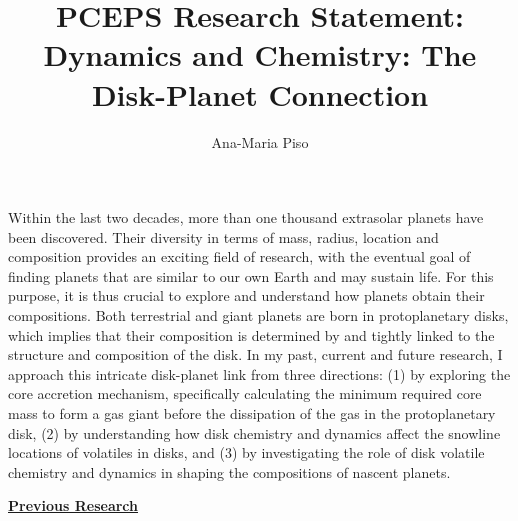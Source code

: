 \documentclass[12pt, letterpaper]{article}
\date{}
\title{\large PCEPS Research Statement: \\
Dynamics and Chemistry: The Disk-Planet Connection \vspace{-2.8ex}}
\author{\normalsize Ana-Maria Piso \vspace{-2.8ex}}
\begin{document}
\maketitle


\vspace{-1.5cm}

Within the last two decades, more than one thousand extrasolar planets have been discovered. Their diversity in terms of mass, radius, location and composition provides an exciting field of research, with the eventual goal of finding planets that are similar to our own Earth and may sustain life. For this purpose, it is thus crucial to explore and understand how planets obtain their compositions. Both terrestrial and giant planets are born in protoplanetary disks, which implies that their composition is determined by and tightly linked to the structure and composition of the disk. In my past, current and future research, I approach this intricate disk-planet link from three directions: (1) by exploring the core accretion mechanism, specifically calculating the minimum required core mass to form a gas giant before the dissipation of the gas in the protoplanetary disk, (2) by understanding how disk chemistry and dynamics affect the snowline locations of volatiles in disks, and (3) by investigating the role of disk volatile chemistry and dynamics in shaping the compositions of nascent planets.

\noindent \underline{\textbf{Previous Research}}

\end{document}
